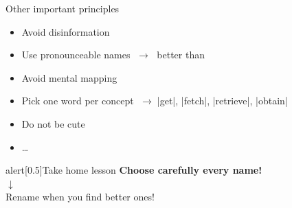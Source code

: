 \begin{frame}[fragile]{Other important principles}
    \vspace{-3mm}
    \begin{itemize}
        \setlength{\itemindent}{-3mm}
        \item Avoid disinformation
        \item \alert{Use pronounceable names} $\;\to\;$  better than 
        \item Avoid mental mapping
        \item Pick \alert{one} word per concept $\;\to\;$\CPP|get|, \CPP|fetch|, \CPP|retrieve|, \CPP|obtain|
        \item Do not be cute
        \item \ldots
    \end{itemize}
    \vspace{-3mm}
    \begin{varblock}{alert}[0.5\textwidth]{Take home lesson}
        \textbf{Choose carefully every name!}\\[1mm]
        $\downarrow$\\[1mm]
        Rename when you find better ones!
    \end{varblock}
\end{frame}


